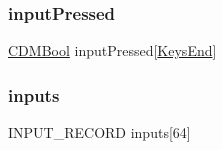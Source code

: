 \subsubsection{\texorpdfstring{input\+Pressed}{inputPressed}}
{\footnotesize\ttfamily \mbox{\hyperlink{_c_d_m_8h_af5296d3141c193195e69417d1825228b}{C\+D\+M\+Bool}} input\+Pressed\mbox{[}\mbox{\hyperlink{_c_d_m_8h_a8e7d3f25fc77053719b079b29784115fa1a4729fd774e28757eb8b774f4866422}{Keys\+End}}\mbox{]}}

\mbox{\label{struct_c_d_m_event_aa410219eafdce1e5eddb4770d9e84288}} 
\subsubsection{\texorpdfstring{inputs}{inputs}}
{\footnotesize\ttfamily I\+N\+P\+U\+T\+\_\+\+R\+E\+C\+O\+RD inputs\mbox{[}64\mbox{]}}

